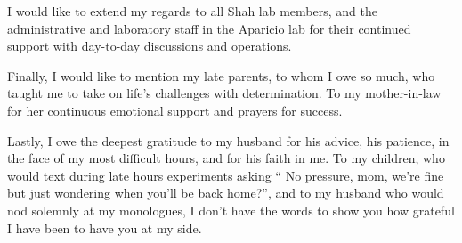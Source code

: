 I would like to extend my regards to all Shah lab members, and the administrative and laboratory staff in the Aparicio lab for their continued support with day-to-day discussions and operations.

Finally, I would like to mention my late parents, to whom I owe so much, who taught me to take on life's challenges with determination. To my mother-in-law for her continuous emotional support and prayers for success. 

Lastly, I owe the deepest gratitude to my husband for his advice, his patience, in the face of my most difficult hours, and for his faith in me. To my children, who would text during late hours experiments asking  `` No pressure, mom, we're fine but just wondering when you'll be back home?'', and to my husband who would nod solemnly at my monologues, I don't have the words to show you how grateful I have been to have you at my side.